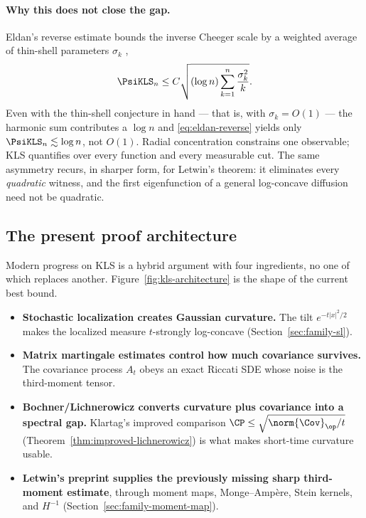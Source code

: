 \documentclass[../../main.tex]{subfiles}
\begin{document}
\paragraph{Why this does not close the gap.}
Eldan's reverse estimate bounds the inverse Cheeger scale by a weighted average of thin-shell
parameters $\sigma_k$ \cite{Eldan2013ThinShell},
\begin{equation}
  \PsiKLS_n\le C\sqrt{(\log n)\sum_{k=1}^n\frac{\sigma_k^2}{k}} .
  \label{eq:eldan-reverse}
\end{equation}
Even with the thin-shell conjecture in hand --- that is, with $\sigma_k=O(1)$ --- the harmonic sum
contributes a $\log n$ and \eqref{eq:eldan-reverse} yields only $\PsiKLS_n\lesssim\log n$, not
$O(1)$. Radial concentration constrains one observable; KLS quantifies over every function and
every measurable cut. The same asymmetry recurs, in sharper form, for Letwin's theorem: it
eliminates every \emph{quadratic} witness, and the first eigenfunction of a general log-concave
diffusion need not be quadratic.

\subsection{The present proof architecture}
\label{subsec:kls-architecture}

Modern progress on KLS is a hybrid argument with four ingredients, no one of which replaces
another. Figure~\ref{fig:kls-architecture} is the shape of the current best bound.

\begin{itemize}[leftmargin=1.6em]
  \item \textbf{Stochastic localization creates Gaussian curvature.} The tilt $e^{-t|x|^2/2}$
  makes the localized measure $t$-strongly log-concave (Section~\ref{sec:family-sl}).
  \item \textbf{Matrix martingale estimates control how much covariance survives.} The covariance
  process $A_t$ obeys an exact Riccati SDE whose noise is the third-moment tensor.
  \item \textbf{Bochner/Lichnerowicz converts curvature plus covariance into a spectral gap.}
  Klartag's improved comparison $\CP\le\sqrt{\norm{\Cov}_\op/t}$
  (Theorem~\ref{thm:improved-lichnerowicz}) is what makes short-time curvature usable.
  \item \textbf{Letwin's preprint supplies the previously missing sharp third-moment estimate},
  through moment maps, Monge--Amp\`ere, Stein kernels, and $H^{-1}$
  (Section~\ref{sec:family-moment-map}).
\end{itemize}
\end{document}
